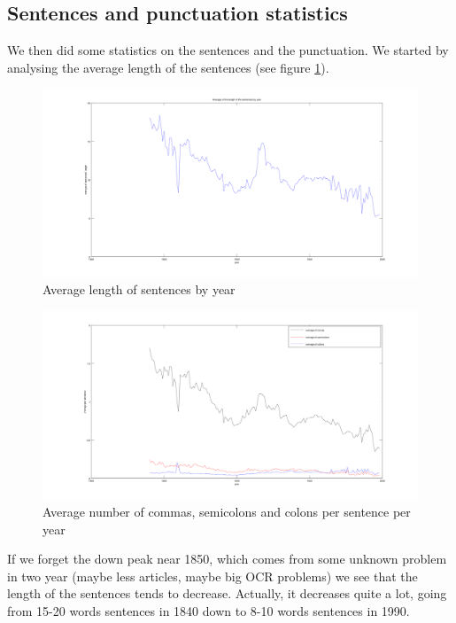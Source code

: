 \subsection{Sentences and punctuation statistics}

We then did some statistics on the sentences and the punctuation. We started by analysing the average length of the sentences (see figure  \ref{average_sent_length_figure}).

\begin{figure}[h!]
	\centering
    \includegraphics[scale=0.15]{Pictures/statistics/sentences-length/means.png}
    \caption{Average length of sentences by year}
    \label{average_sent_length_figure}\hfill
\end{figure}

\begin{figure}[h!]
	\centering
    \includegraphics[scale=0.15]{Pictures/statistics/punctuation/graph.png}
    \caption{Average number of commas, semicolons and colons per sentence per year}
    \label{average_punct}\hfill
\end{figure}

If we forget the down peak near 1850, which comes from some unknown problem in two year (maybe less articles, maybe big OCR problems) we see that the length of the sentences tends to decrease. Actually, it decreases quite a lot, going from 15-20 words sentences in 1840 down to 8-10 words sentences in 1990.

